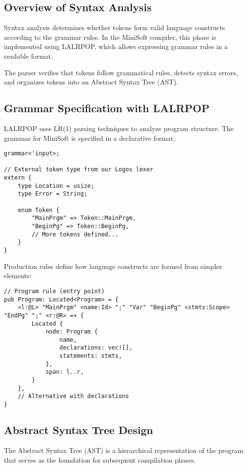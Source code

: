 \documentclass[12pt,a4paper]{article}
\begin{document}
\subsection{Overview of Syntax Analysis}
Syntax analysis determines whether tokens form valid language constructs according to the grammar rules. In the MiniSoft compiler, this phase is implemented using LALRPOP, which allows expressing grammar rules in a readable format.

The parser verifies that tokens follow grammatical rules, detects syntax errors, and organizes tokens into an Abstract Syntax Tree (AST).

\subsection{Grammar Specification with LALRPOP}
LALRPOP uses LR(1) parsing techniques to analyze program structure. The grammar for MiniSoft is specified in a declarative format.

\begin{lstlisting}[caption={Grammar File Structure}]
grammar<'input>;

// External token type from our Logos lexer
extern {
    type Location = usize;
    type Error = String;

    enum Token {
        "MainPrgm" => Token::MainPrgm,
        "BeginPg" => Token::BeginPg,
        // More tokens defined...
    }
}
\end{lstlisting}

Production rules define how language constructs are formed from simpler elements:

\begin{lstlisting}[caption={Program Rule Example}]
// Program rule (entry point)
pub Program: Located<Program> = {
    <l:@L> "MainPrgm" <name:Id> ";" "Var" "BeginPg" <stmts:Scope> "EndPg" ";" <r:@R> => {
        Located {
            node: Program {
                name,
                declarations: vec![],
                statements: stmts,
            },
            span: l..r,
        }
    },
    // Alternative with declarations
}
\end{lstlisting}

\subsection{Abstract Syntax Tree Design}
The Abstract Syntax Tree (AST) is a hierarchical representation of the program that serves as the foundation for subsequent compilation phases.
\end{document}
